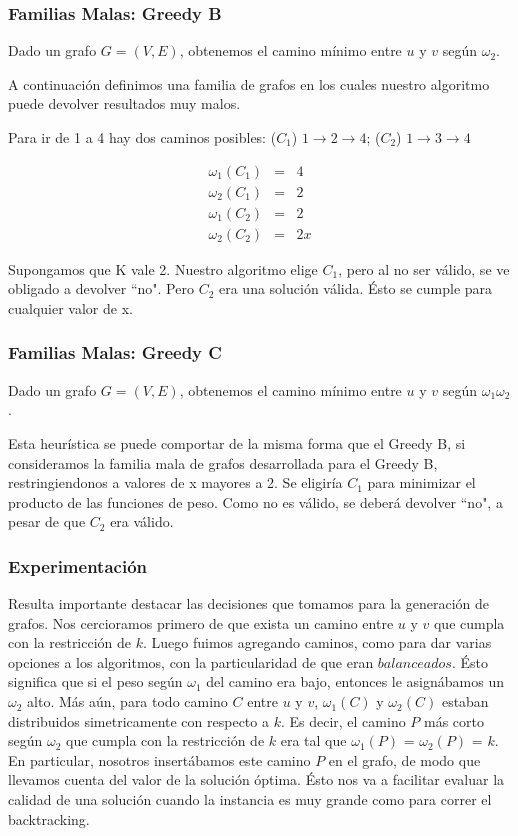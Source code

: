 \clearpage
\subsubsection{Familias Malas: Greedy B}\label{subsubsec:greedy-b}
Dado un grafo $G = (V,E)$, obtenemos el camino m\'inimo entre $u$ y $v$ seg\'un $\omega_2$. 

A continuación definimos una familia de grafos en los cuales nuestro algoritmo puede devolver resultados muy malos.

Para ir de 1 a 4 hay dos caminos posibles: ($C_1$) $1 \rightarrow 2 \rightarrow 4$; ($C_2$) $1 \rightarrow 3 \rightarrow 4$

\begin{eqnarray}
 \omega_1(C_1) &=& 4 	\\ 
 \omega_2(C_1) &=& 2	\\
 \omega_1(C_2) &=& 2	\\
 \omega_2(C_2) &=& 2x
\end{eqnarray}

Supongamos que K vale 2. Nuestro algoritmo elige $C_1$, pero al no ser válido, se ve obligado a devolver ``no". Pero $C_2$ era una solución
válida. Ésto se cumple para cualquier valor de x.

\clearpage
\subsubsection{Familias Malas: Greedy C}\label{subsubsec:greedy-c}
Dado un grafo $G = (V,E)$, obtenemos el camino m\'inimo entre $u$ y $v$ seg\'un $\omega_1\omega_2$. 

Esta heurística se puede comportar de la misma forma que el Greedy B, si consideramos la familia mala de grafos desarrollada para el Greedy B,
restringiendonos a valores de x mayores a 2. Se eligiría $C_1$  para minimizar el producto de las funciones de peso. Como no es válido,
se deberá devolver ``no", a pesar de que $C_2$ era válido. 

\subsubsection{Experimentación}
Resulta importante destacar las decisiones que tomamos para la generación de grafos. Nos cercioramos primero de que exista un camino entre $u$ y
$v$ que cumpla con la restricción de $k$. Luego fuimos agregando caminos, como para dar varias opciones a los algoritmos, con la particularidad
de que eran $balanceados$. Ésto significa que si el peso según $\omega_1$ del camino era bajo, entonces le asignábamos un $\omega_2$ alto.
Más aún, para todo camino $C$ entre $u$ y $v$, $\omega_1(C)$ y $\omega_2(C)$ estaban distribuidos simetricamente con respecto a $k$.
Es decir, el camino $P$ más corto según $\omega_2$ que cumpla con la restricción de $k$ era tal que $\omega_1(P)$ = $\omega_2(P)$ = $k$.
En particular, nosotros insertábamos este camino $P$ en el grafo, de modo que llevamos cuenta del valor de la solución óptima. Ésto nos va a
facilitar evaluar la calidad de una solución cuando la instancia es muy grande como para correr el backtracking.



